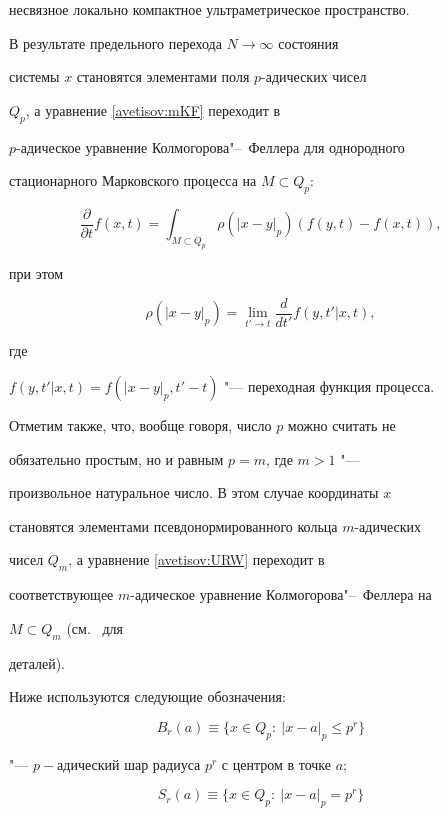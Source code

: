 несвязное локально компактное ультраметрическое пространство.



В результате предельного перехода $N\rightarrow\infty$  состояния

системы $x$ становятся элементами поля $p$-адических чисел

$Q_{p}$, а уравнение \eqref{avetisov:mKF} переходит в

$p$-адическое уравнение Колмогорова"--~Феллера для однородного

стационарного Марковского процесса на $M\subset Q_{p}$:

\begin{equation}

\frac{\partial}{\partial t}f(x,t)=\int_{M\subset

Q_{p}}\rho(|x-y|_{p})(f(y,t)-f(x,t)),\label{avetisov:URW}

\end{equation}

при этом 

$$\rho(|x-y|_{p})=\lim\limits_{t'\rightarrow t} \frac{d}{dt'}f(y,t'|x,t),$$ 

где

$f(y,t'|x,t)=f(|x-y|_{p},t'-t)$ "--- переходная функция процесса.



Отметим также, что, вообще говоря, число $p$ можно считать не

обязательно простым, но и равным  $p=m$, где $m>1$ "---

произвольное натуральное число. В этом случае координаты $x$

становятся элементами псевдонормированного кольца $m$-адических

чисел $Q_{m}$, а уравнение \eqref{avetisov:URW} переходит в

соответствующее $m$-адическое уравнение Колмогорова"--~Феллера на

$M\subset Q_{m}$ (см.~\cite{avetisov_bikulov_zubarev:bib:DZ} для

деталей).





Ниже используются следующие обозначения: 

$$B_{r}(a)\equiv\{x\in Q_{p}:\:|x-a|_{p}\leq p^{r}\}$$ 

"--- $p-$адический шар радиуса $p^{r}$ с центром в точке $a$; 

$$S_{r}(a)\equiv\{x\in Q_{p}:\:|x-a|_{p}=p^{r}\}$$ 

